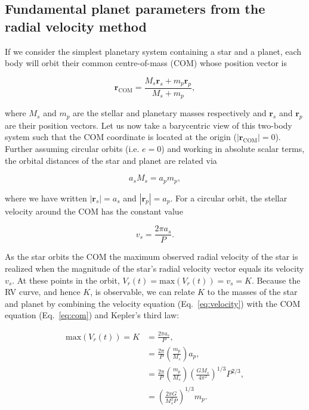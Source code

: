 \subsection{Fundamental planet parameters from the radial velocity method} \label{sect:K}
If we consider the simplest planetary system containing a star and a planet, each body will 
orbit their common centre-of-mass (COM) whose position vector is

\begin{equation}
\mathbf{r}_{\mathrm{COM}} = \frac{M_s \mathbf{r}_s + m_p \mathbf{r}_p}{M_s + m_p},
\end{equation}

\noindent where $M_s$ and $m_p$ are the stellar and planetary masses respectively and
$\mathbf{r}_s$ and $\mathbf{r}_p$ are their position vectors. 
Let us now take a barycentric view of this two-body system such that the 
COM coordinate is located at the origin ($|\mathbf{r}_{\mathrm{COM}}|=0$). Further
assuming circular orbits (i.e. $e=0$) and working 
in absolute scalar terms, the orbital distances of the star and planet are  
related via 

\begin{equation}
a_s M_s = a_p m_p,
\label{eq:com}
\end{equation}
  
\noindent where we have written $|\mathbf{r}_s|=a_s$ and 
$|\mathbf{r}_p|=a_p$. For a circular orbit, the stellar velocity around the COM has
the constant value

\begin{equation}
v_s = \frac{2\pi a_s}{P}.
\label{eq:velocity}
\end{equation}

\noindent As the star orbits the COM the maximum observed radial velocity of the star
is realized when the magnitude of the star's radial velocity vector
equals its velocity $v_s$. At these points in the orbit, $V_r(t)=\text{max}(V_r(t))=v_s=K$.
Because the RV curve, and hence $K$, is observable, 
we can relate $K$ to the masses of the star and planet by combining the velocity 
equation (Eq.~\ref{eq:velocity}) with the COM equation (Eq.~\ref{eq:com})
and Kepler's third law:

\begin{align}
\mathrm{max}(V_r(t)) = K &= \frac{2\pi a_s}{P}, \\
&= \frac{2\pi}{P} \left( \frac{m_p}{M_s} \right) a_p, \\
&= \frac{2\pi}{P} \left( \frac{m_p}{M_s} \right) \left( \frac{GM_s}{4\pi^2} \right)^{1/3} P^{2/3}, \\
&= \left( \frac{2\pi G}{M_s^2 P} \right)^{1/3} m_p. \label{eq:K1}
\end{align}

